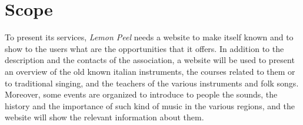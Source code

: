 \documentclass[../../DD.tex]{subfiles}
\begin{document}
\section{Scope}
To present its services, \textit{Lemon Peel} needs a website to make itself known and to show to the users what are the opportunities that it offers.
\newline In addition to the description and the contacts of the association, a website will be used to present an overview of the old known italian instruments, the courses related to them or to traditional singing, and the teachers of the various instruments and folk songs. Moreover, some events are organized to introduce to people the sounds, the history and the importance of such kind of music in the various regions, and the website will show the relevant information about them.
\end{document}
